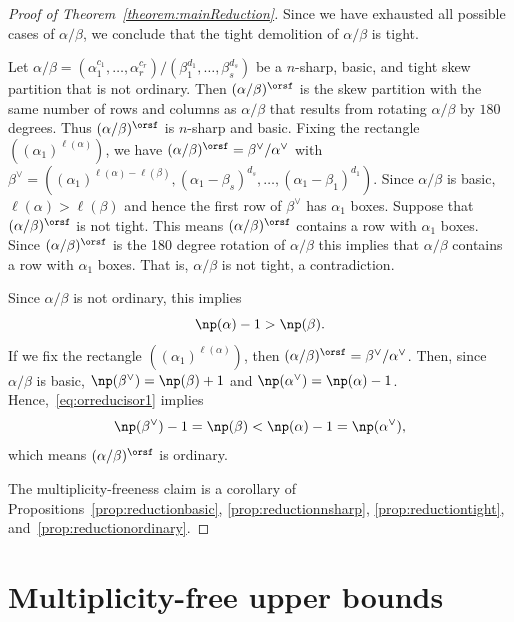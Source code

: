 \begin{proof}[Proof of Theorem~\ref{theorem:mainReduction}]
Since we have exhausted all possible cases of $\alpha/\beta$, we conclude that the tight demolition of $\alpha/\beta$ is tight.

Let $\alpha / \beta = (\alpha_1^{c_1},\ldots,\alpha_r^{c_r}) / (\beta_1^{d_1},\ldots,\beta_s^{d_s})$ be a $n$-sharp, basic, and tight skew partition that is not ordinary. Then $(\alpha / \beta)^{\orsf}$ is the skew partition with the same number of rows and columns as $\alpha / \beta$ that results from rotating $\alpha / \beta$ by $180$ degrees. Thus $(\alpha / \beta)^{\orsf}$ is $n$-sharp and basic. Fixing the rectangle $((\alpha_1)^{\ell(\alpha)})$, we have $(\alpha / \beta)^{\orsf} = \beta^{\vee} / \alpha^{\vee}$ with $\beta^{\vee} = ((\alpha_1)^{\ell(\alpha) - \ell(\beta)},(\alpha_1-\beta_s)^{d_s},\ldots, (\alpha_1-\beta_1)^{d_1})$. Since $\alpha / \beta$ is basic, $\ell(\alpha) > \ell(\beta)$ and hence the first row of $\beta^{\vee}$ has $\alpha_1$ boxes. Suppose that $(\alpha / \beta)^{\orsf}$ is not tight. This means $(\alpha / \beta)^{\orsf}$ contains a row with $\alpha_1$ boxes. Since $(\alpha / \beta)^{\orsf}$ is the 180 degree rotation of $\alpha / \beta$ this implies that $\alpha / \beta$ contains a row with $\alpha_1$ boxes. That is, $\alpha / \beta$ is not tight, a contradiction.

Since $\alpha / \beta$ is not ordinary, this implies 
\begin{equation}
\label{eq:orreducisor1}
\np (\alpha) - 1 > \np (\beta).
\end{equation}
If we fix the rectangle $((\alpha_1)^{\ell(\alpha)})$, then $(\alpha / \beta)^{\orsf} = \beta^{\vee} / \alpha^{\vee}$. Then, since $\alpha / \beta$ is basic, $\np (\beta^{\vee}) = \np (\beta) + 1$ and $\np (\alpha^{\vee}) = \np (\alpha) - 1$. Hence,~\eqref{eq:orreducisor1} implies
\begin{equation}
\np (\beta^{\vee}) - 1 = \np (\beta) < \np (\alpha) - 1 = \np (\alpha^{\vee}),
\end{equation}
which means $(\alpha / \beta)^{\orsf}$ is ordinary.

The multiplicity-freeness claim is a corollary of Propositions~\ref{prop:reductionbasic}, \ref{prop:reductionnsharp}, \ref{prop:reductiontight}, and~\ref{prop:reductionordinary}.
\end{proof}


\section{Multiplicity-free upper bounds}

